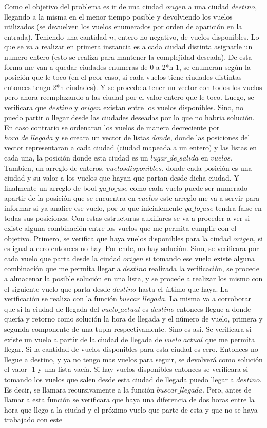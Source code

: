 \documentclass[a4paper]{article}
\begin{document}
Como el objetivo del problema es ir de una ciudad $origen$  a una ciudad $destino$,  llegando a la misma en el menor tiempo posible y devolviendo los vuelos utilizados (se devuelven los vuelos enumerados por orden de aparición en la entrada). Teniendo una cantidad $n$, entero no negativo, de vuelos disponibles. Lo que se va a realizar en primera instancia es a cada ciudad distinta asignarle un numero entero (esto se realiza para mantener la complejidad deseada). De esta forma me van a quedar ciudades enumeras de 0 a 2*n-1, se enumeran según la posición que le toco (en el peor caso, si cada vuelos tiene ciudades distintas entonces tengo 2*n ciudades). Y se procede a tener un vector con todos los vuelos pero ahora reemplazando a las ciudad por el valor entero que le toco. Luego, se verificara que $destino$ y $origen$ existan entre los vuelos disponibles. Sino, no puedo partir o llegar desde las ciudades deseadas por lo que no habria solución. En caso contrario se ordenaran los vuelos de manera decreciente por $hora\_de\_llegada$ y se creara un vector de listas $donde$, donde las posiciones del vector representaran a cada ciudad (ciudad mapeada a un entero) y las listas en cada una, la posición donde esta ciudad es un $lugar\_de\_salida$ en $vuelos$. Tambien, un arreglo de enteros, $vuelos disponibles$, donde cada posición es una ciudad y su valor a los vuelos que hayan que partan desde dicha ciudad. Y finalmente un arreglo de bool $ya\_lo\_use$ como cada vuelo puede ser numerado apartir de la posición que se encuentra en $vuelos$ este arreglo me va a servir para informar si ya analice ese vuelo, por lo que inicialemente $ya\_lo\_use$ tendra false en todas sus posiciones. Con estas estructuras auxiliares se va a proceder a ver si existe alguna combinación entre los vuelos que me permita cumplir con el objetivo. Primero, se verifica que haya vuelos disponibles para la ciudad $origen$, si es igual a cero entonces no hay. Por ende, no hay solución. Sino, se verificara por cada vuelo que parta desde la ciudad $origen$ si tomando ese vuelo existe alguna combinación que me permita llegar a $destino$ realizada la verificación, se procede  a almacenar la posible solución en una lista, y se procede a realizar los mismo con el siguiente vuelo que parta desde $destino$ hasta el último que haya. La verificación se realiza con la función  $buscar\_llegada$. La misma va a corroborar que si la ciudad de llegada del $vuelo\_actual$ es $destino$ entonces llegue a donde quería y retorno como solución la hora de llegada y el número de vuelo, primera y segunda componente de una tupla respectivamente. Sino es así. Se verificara si existe un vuelo a partir de la ciudad de llegada de $vuelo\_actual$ que me permita llegar. Si la cantidad de vuelos disponibles para esta ciudad es cero. Entonces no llegue a destino, y ya no tengo mas vuelos para seguir, se devolverá como solución el valor -1 y una lista vacía. Si hay vuelos disponibles entonces se verificara si tomando los vuelos que salen desde esta ciudad de llegada puedo llegar a $destino$. Es decir, se llamara recursivamente a la función $buscar\_llegada$. Pero, antes de llamar a esta función se verificara que haya una diferencia de dos horas entre la hora que llego a la ciudad y el próximo vuelo que parte de esta y que no se haya trabajado con este 
\end{document}
